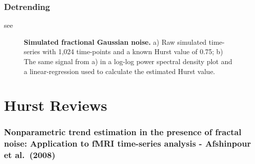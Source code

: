 \documentclass[
  sn-vancouver,
  Numbered,
  referee,
  lineno]{sn-jnl}
\begin{document}
\subsubsection{Detrending}\label{detrending-1}

see \citet{tanabeComparisonDetrendingMethods2002}

\label{cell-fig-scaleinvariance}
\begin{figure}[H]


\caption{\label{fig-scaleinvariance}\textbf{Simulated fractional
Gaussian noise.} a) Raw simulated time-series with 1,024 time-points and
a known Hurst value of 0.75; b) The same signal from a) in a log-log
power spectral density plot and a linear-regression used to calculate
the estimated Hurst value.}

\end{figure}%

\section{Hurst Reviews}\label{hurst-reviews-1}

\subsubsection{\texorpdfstring{Nonparametric trend estimation in the
presence of fractal noise: Application to fMRI time-series analysis -
Afshinpour et al.~(2008)
\citep{afshinpourNonparametricTrendEstimation2008}}{Nonparametric trend estimation in the presence of fractal noise: Application to fMRI time-series analysis - Afshinpour et al.~(2008) {[}@afshinpourNonparametricTrendEstimation2008{]}}}\label{nonparametric-trend-estimation-in-the-presence-of-fractal-noise-application-to-fmri-time-series-analysis---afshinpour-et-al.-2008-afshinpournonparametrictrendestimation2008-1}
\end{document}

